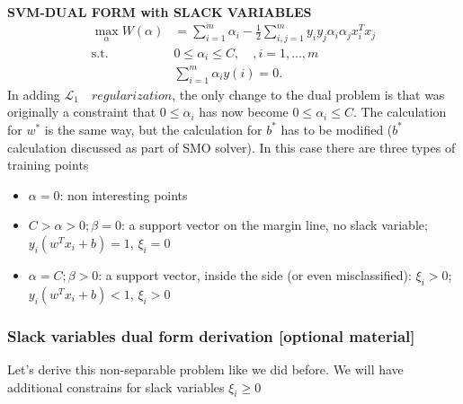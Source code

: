 \documentclass[a4paper]{article}
\begin{document}
\textbf{SVM-DUAL FORM with SLACK VARIABLES}
\begin{align}
	\max_{\alpha} W(\alpha) &= \sum_{i=1}^{m} \alpha_i - \frac{1}{2} \sum_{i,j=1}^{m} y_i y_j \alpha_i \alpha_j x_i^T x_j	\\
		\text{s.t.} \quad & 0 \leq \alpha_i \leq C, \quad, i = 1, \dots, m \nonumber \\
		& \sum_{i=1}^{m} \alpha_i y{(i)} = 0. \nonumber
\end{align}
In adding $\mathcal{L}_1 \quad regularization$, the only change to the dual problem is that was originally a constraint that $0 \leq \alpha_i$ has now become $0 \leq \alpha_i \leq C$. The calculation for $w^\ast$ is the same way, but the calculation for $b^\ast$ has to be modified ($b^\ast$ calculation discussed as part of SMO solver). In this case there are three types of training points
\begin {itemize}
\item $\alpha=0$: non interesting points
 \item $C>\alpha>0; \beta=0$:  a support vector on the margin line, no slack variable; \quad $y_i (w^T x_i + b) = 1$, $\xi_i=0$
 \item $\alpha=C; \beta>0$: a support vector, inside the side (or even misclassified): $\xi_i>0$; $y_i (w^T x_i + b) < 1$, $\xi_i>0$
\end{itemize}


\subsubsection {Slack variables dual form derivation [optional material]}
Let's derive this non-separable problem like we did before. We will have additional constrains for slack variables $ \xi_i\geq0$
\end{document}
